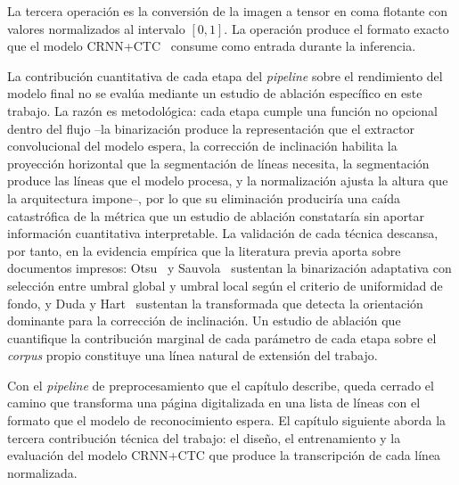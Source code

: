La tercera operación es la conversión de la imagen a tensor en coma flotante con valores normalizados al intervalo $[0, 1]$. La operación produce el formato exacto que el modelo CRNN+CTC~\cite{shi2016crnn,graves2006ctc} consume como entrada durante la inferencia.

La contribución cuantitativa de cada etapa del \textit{pipeline} sobre el rendimiento del modelo final no se evalúa mediante un estudio de ablación específico en este trabajo. La razón es metodológica: cada etapa cumple una función no opcional dentro del flujo --la binarización produce la representación que el extractor convolucional del modelo espera, la corrección de inclinación habilita la proyección horizontal que la segmentación de líneas necesita, la segmentación produce las líneas que el modelo procesa, y la normalización ajusta la altura que la arquitectura impone--, por lo que su eliminación produciría una caída catastrófica de la métrica que un estudio de ablación constataría sin aportar información cuantitativa interpretable. La validación de cada técnica descansa, por tanto, en la evidencia empírica que la literatura previa aporta sobre documentos impresos: Otsu~\cite{otsu1979threshold} y Sauvola~\cite{sauvola2000binarization} sustentan la binarización adaptativa con selección entre umbral global y umbral local según el criterio de uniformidad de fondo, y Duda y Hart~\cite{duda1972hough} sustentan la transformada que detecta la orientación dominante para la corrección de inclinación. Un estudio de ablación que cuantifique la contribución marginal de cada parámetro de cada etapa sobre el \textit{corpus} propio constituye una línea natural de extensión del trabajo.


Con el \textit{pipeline} de preprocesamiento que el capítulo describe, queda cerrado el camino que transforma una página digitalizada en una lista de líneas con el formato que el modelo de reconocimiento espera. El capítulo siguiente aborda la tercera contribución técnica del trabajo: el diseño, el entrenamiento y la evaluación del modelo CRNN+CTC que produce la transcripción de cada línea normalizada.
